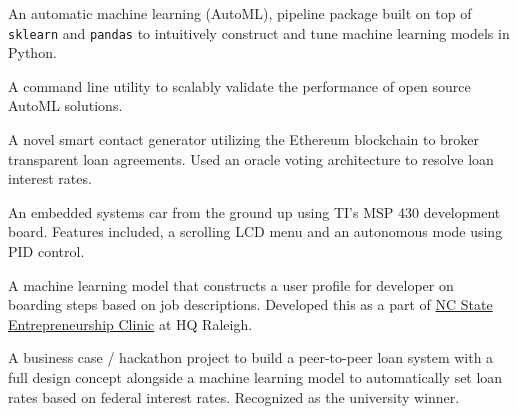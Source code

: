 
\newcommand{\eclinic}[1]{\href{https://entrepreneurship.ncsu.edu/spaces/entrepreneurship-clinic/}{#1}}

{%
	An automatic machine learning (AutoML), pipeline package built on top of \texttt{sklearn} and \texttt{pandas} to intuitively construct and tune machine learning models in Python.
}

\vspace{0.5em}

{%
	A command line utility to scalably validate the performance of open source AutoML solutions.
}

\vspace{0.5em}

{%
	A novel smart contact generator utilizing the Ethereum blockchain to broker transparent loan agreements. Used an oracle voting architecture to resolve loan interest rates.
}

\vspace{0.5em}

{%
	An embedded systems car from the ground up using TI's MSP 430 development board. Features included, a scrolling LCD menu and an autonomous mode using PID control.
}

\vspace{0.5em}

{%
	A machine learning model that constructs a user profile for developer on boarding steps based on job descriptions. Developed this as a part of \eclinic{NC State Entrepreneurship Clinic} at HQ Raleigh.
}

\vspace{0.5em}

{%
	A business case / hackathon project to build a peer-to-peer loan system with a full design concept alongside a machine learning model to automatically set loan rates based on federal interest rates. Recognized as the university winner.
}

\vspace{0.5em}

